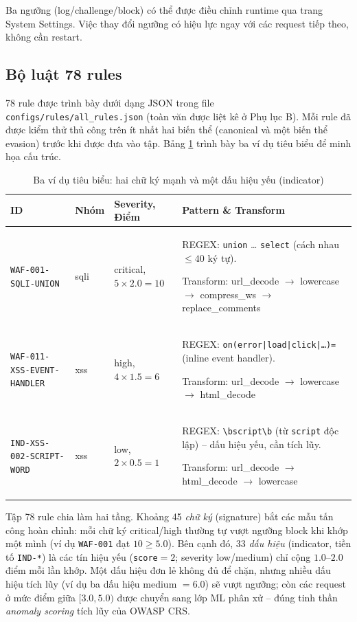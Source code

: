 \documentclass[../DoAn.tex]{subfiles}
\begin{document}
Ba ngưỡng (log/challenge/block) có thể được điều chỉnh runtime qua trang
System Settings. Việc thay đổi ngưỡng có hiệu lực ngay với các request tiếp
theo, không cần restart.

\subsection{Bộ luật 78 rules}
\label{subsection:4.2.5}

78 rule được trình bày dưới dạng JSON trong file \texttt{configs/rules/all\_rules.json}
(toàn văn được liệt kê ở Phụ lục B). Mỗi rule đã được kiểm thử thủ công
trên ít nhất hai biến thể (canonical và một biến thể evasion) trước khi
được đưa vào tập. Bảng \ref{table:sample-rules} trình bày ba ví dụ tiêu
biểu để minh họa cấu trúc.

\begin{table}[h!]
\centering
\caption{Ba ví dụ tiêu biểu: hai chữ ký mạnh và một dấu hiệu yếu (indicator)}
\label{table:sample-rules}
\small
\begin{tabular}{|p{3.1cm}|l|l|p{4.6cm}|}
\hline
\textbf{ID} & \textbf{Nhóm} & \textbf{Severity, Điểm} & \textbf{Pattern \& Transform} \\
\hline
\texttt{WAF-001-SQLI-UNION} & sqli & critical, \(5\times2.0=10\) &
REGEX: \texttt{union} \ldots{} \texttt{select} (cách nhau \(\le 40\) ký tự).\par
Transform: url\_decode \(\to\) lowercase \(\to\) compress\_ws \(\to\) replace\_comments \\
\hline
\texttt{WAF-011-XSS-EVENT-HANDLER} & xss & high, \(4\times1.5=6\) &
REGEX: \texttt{on(error|load|click|\ldots)=} (inline event handler).\par
Transform: url\_decode \(\to\) lowercase \(\to\) html\_decode \\
\hline
\texttt{IND-XSS-002-SCRIPT-WORD} & xss & low, \(2\times0.5=1\) &
REGEX: \texttt{\textbackslash bscript\textbackslash b} (từ \texttt{script} độc lập) -- dấu hiệu yếu, cần tích lũy.\par
Transform: url\_decode \(\to\) html\_decode \(\to\) lowercase \\
\hline
\end{tabular}
\end{table}

Tập 78 rule chia làm hai tầng. Khoảng 45 \textit{chữ ký} (signature) bắt các
mẫu tấn công hoàn chỉnh: mỗi chữ ký critical/high thường tự vượt ngưỡng block
khi khớp một mình (ví dụ \texttt{WAF-001} đạt \(10 \ge 5.0\)). Bên cạnh đó, 33
\textit{dấu hiệu} (indicator, tiền tố \texttt{IND-*}) là các tín hiệu yếu
(\texttt{score}\(=2\); severity low/medium) chỉ cộng \(1.0\)--\(2.0\) điểm mỗi
lần khớp. Một dấu hiệu đơn lẻ không đủ để chặn, nhưng nhiều dấu hiệu tích lũy
(ví dụ ba dấu hiệu medium \(=6.0\)) sẽ vượt ngưỡng; còn các request ở mức điểm
giữa \([3.0, 5.0)\) được chuyển sang lớp ML phân xử -- đúng tinh thần
\textit{anomaly scoring} tích lũy của OWASP CRS.
\end{document}
